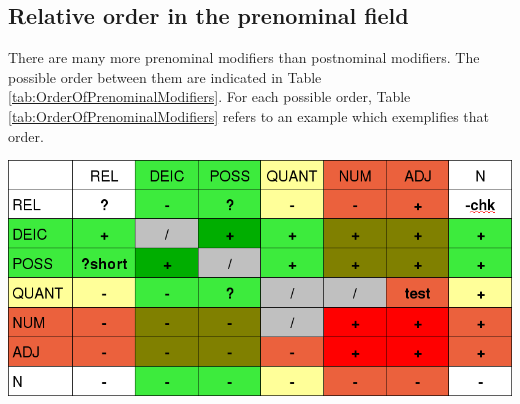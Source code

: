 \subsection{Relative order in the prenominal field}\label{sec:nppp:Relativeorderintheprenominalfield}


There are many more prenominal modifiers than postnominal modifiers. The possible order between them are indicated in Table \ref{tab:OrderOfPrenominalModifiers}. For each possible order, Table \ref{tab:OrderOfPrenominalModifiers} refers to an example which exemplifies that order.


\begin{table}
	\centering
\includegraphics[height=0.3\textwidth]{pics/ModNPtable}


\end{table}
